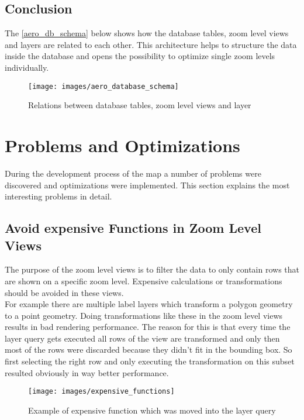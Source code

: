 \subsection{Conclusion}

The \autoref{aero_db_schema} below shows how the database tables, zoom level views and layers are related to each other. This architecture helps to structure the \osm{} data inside the database and opens the possibility to optimize single zoom levels individually.

\begin{figure}[H]
\centering
\texttt{[image: images/aero\_database\_schema]}
\caption{Relations between database tables, zoom level views and layer}
\label{aero_db_schema}
\end{figure}

\section{Problems and Optimizations}

During the development process of the map a number of problems were discovered and optimizations were implemented. This section explains the most interesting problems in detail.

\subsection{Avoid expensive Functions in Zoom Level Views}

The purpose of the zoom level views is to filter the data to only contain rows that are shown on a specific zoom level. Expensive calculations or transformations should be avoided in these views.\\
For example there are multiple label layers which transform a polygon geometry to a point geometry. Doing transformations like these in the zoom level views results in bad rendering performance. 
The reason for this is that every time the layer query gets executed all rows of the view are transformed and only then most of the rows were discarded because they didn't fit in the bounding box. So first selecting the right row and only executing the transformation on this subset resulted obviously in way better performance.

\begin{figure}[H]
\centering
\texttt{[image: images/expensive\_functions]}
\caption{Example of expensive function which was moved into the layer query}
\end{figure}


